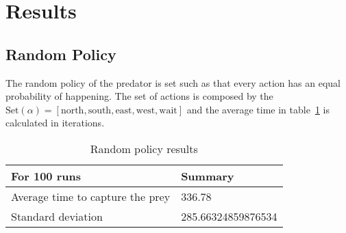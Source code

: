 \documentclass[paper=a4, fontsize=11pt]{scrartcl}
\numberwithin{equation}{section}		%
\numberwithin{figure}{section}			%
\numberwithin{table}{section}				%
\begin{document}
\section{Results}
\label{results}

\subsection{Random Policy}
The random policy of the predator is set such as that every action has an equal probability of happening. The set of actions is composed by the $\text{Set}(\alpha) = [\text{north},\text{south},\text{east},\text{west},\text{wait}]$ and the average time in table~\ref{random} is calculated in iterations.

\begin{table}[H]
\caption{Random policy results}
\centering
    \begin{tabular}{| l || l |}
    \hline
     For 100 runs & Summary \\ \hline
    Average time to capture the prey & 336.78\\ \hline
    Standard deviation & 285.66324859876534 \\
    \hline
    \end{tabular}
    \label{random}
\end{table}
\end{document}
